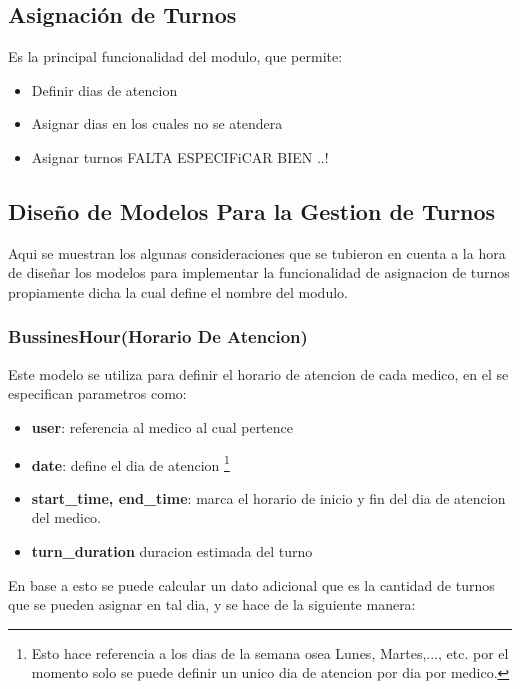 \subsection{Asignaci\'on de Turnos}  

Es la principal funcionalidad del modulo, que permite:

\begin{itemize}
    \item Definir dias de atencion
    \item Asignar dias en los cuales no se atendera     
    \item Asignar turnos
    FALTA ESPECIFiCAR BIEN ..!
\end{itemize}


\subsection{Dise\~no de Modelos Para la Gestion de Turnos}

Aqui se muestran los algunas consideraciones que se tubieron en cuenta a la hora de 
dise\~nar los modelos para implementar la funcionalidad de asignacion de turnos
propiamente dicha la cual define el nombre del modulo. 

\subsubsection{BussinesHour(Horario De Atencion)}

Este modelo se utiliza para definir el horario de atencion de cada medico, en 
el se especifican parametros como:

\begin{itemize}
    \item \textbf{user}: referencia al medico al cual pertence 
    \item \textbf{date}: define el dia de atencion \footnote{Esto hace 
        referencia a los dias de la semana osea Lunes, Martes,..., etc. por el 
        momento solo se puede definir un unico dia de atencion por dia por 
    medico.}
    \item \textbf{start\_time, end\_time}: marca el horario de inicio y fin del 
        dia de atencion del medico.
    \item \textbf{turn\_duration} duracion estimada del turno
\end{itemize}

En base a esto se puede calcular un dato adicional que es la cantidad de turnos
que se pueden asignar en tal dia, y se hace de la siguiente manera:

